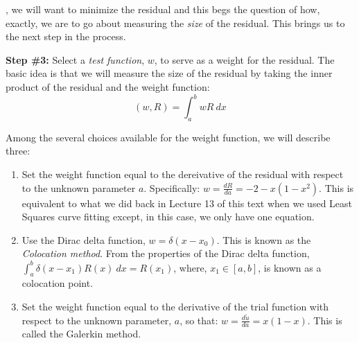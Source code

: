 , we will want to minimize the residual and this begs the question of how, exactly, we are to go about measuring the \emph{size} of the residual.  This brings us to the next step in the process.


\vspace{0.25cm}

\noindent\textbf{Step \#3:} Select a \emph{test function}, $w$, to serve as a weight for the residual.  The basic idea is that we will measure the size of the residual by taking the inner product of the residual and the weight function:
\begin{equation*}
\left(w,R\right) = \int_{a}^{b} wR\ dx
\end{equation*}

Among the several choices available for the weight function, we will describe three:
\begin{enumerate}
\item Set the weight function equal to the dereivative of the residual with respect to the unknown parameter $a$.  Specifically: $w=\frac{dR}{da} = -2 - x(1-x^2)$.  This is equivalent to what we did back in Lecture 13 of this text when we used Least Squares curve fitting except, in this case, we only have one equation.

\item Use the Dirac delta function, $w = \delta(x-x_0)$.  This is known as the \emph{Colocation method}.  From the properties of the Dirac delta function, $\int_{a}^{b} \delta{(x-x_1)}R(x) \ dx = R(x_1)$, where, $x_1 \in [a,b]$, is known as a colocation point.   

\item Set the weight function equal to the derivative of the trial function with respect to the unknown parameter, $a$, so that: $w = \frac{d\tilde{u}}{da} = x(1-x)$. This is called the Galerkin method.
\end{enumerate}

